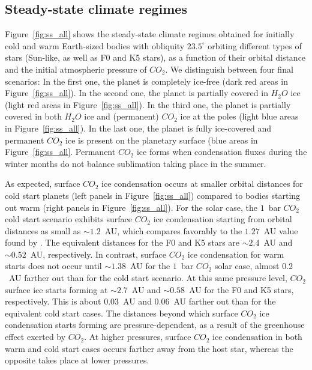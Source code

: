 \documentclass[fleqn,usenatbib]{mnras}
\begin{document}
\subsection{Steady-state climate regimes}

Figure~\ref{fig:ss_all} shows the steady-state climate regimes obtained for initially cold and warm Earth-sized bodies with obliquity $23.5^{\circ}$ orbiting different types of stars (Sun-like, as well as F0 and K5 stars), as a function of their orbital distance and the initial atmospheric pressure of $CO_{\mathrm{2}}$. We distinguish between four final scenarios: In the first one, the planet is completely ice-free (dark red areas in Figure~\ref{fig:ss_all}). In the second one, the planet is partially covered in $H_{\mathrm{2}}O$ ice (light red areas in Figure~\ref{fig:ss_all}). In the third one, the planet is partially covered in both $H_{\mathrm{2}}O$ ice and (permanent) $CO_{\mathrm{2}}$ ice at the poles (light blue areas in Figure~\ref{fig:ss_all}). In the last one, the planet is fully ice-covered and permanent $CO_{\mathrm{2}}$ ice is present on the planetary surface (blue areas in Figure~\ref{fig:ss_all}. Permanent $CO_{\mathrm{2}}$ ice forms when condensation fluxes during the winter months do not balance sublimation taking place in the summer. 

As expected, surface $CO_{\mathrm{2}}$ ice condensation occurs at smaller orbital distances for cold start planets (left panels in Figure~\ref{fig:ss_all}) compared to bodies starting out warm (right panels in Figure~\ref{fig:ss_all}).
For the solar case, the $1$~bar $CO_{\mathrm{2}}$ cold start scenario exhibits surface $CO_{\mathrm{2}}$ ice condensation starting from orbital distances as small as $\sim1.2$~AU, which compares favorably to the $1.27$~AU value found by \citet{Turbet2017}. The equivalent distances for the F0 and K5 stars are $\sim2.4$~AU and $\sim0.52$~AU, respectively.
In contrast, surface $CO_{\mathrm{2}}$ ice condensation for warm starts does not occur until $\sim1.38$~AU for the $1$~bar $CO_{\mathrm{2}}$ solar case, almost  $0.2$~AU farther out than for the cold start scenario. At this same pressure level, $CO_{\mathrm{2}}$ surface ice starts forming at $\sim2.7$~AU and $\sim0.58$~AU for the F0 and K5 stars, respectively. This is about $0.03$~AU and $0.06$~AU farther out than for the equivalent cold start cases.
The distances beyond which surface $CO_{\mathrm{2}}$ ice condensation starts forming are pressure-dependent, as a result of the greenhouse effect exerted by $CO_{\mathrm{2}}$. At higher pressures, surface $CO_{\mathrm{2}}$ ice condensation in both warm and cold start cases occurs farther away from the host star, whereas the opposite takes place at lower pressures.
\end{document}

